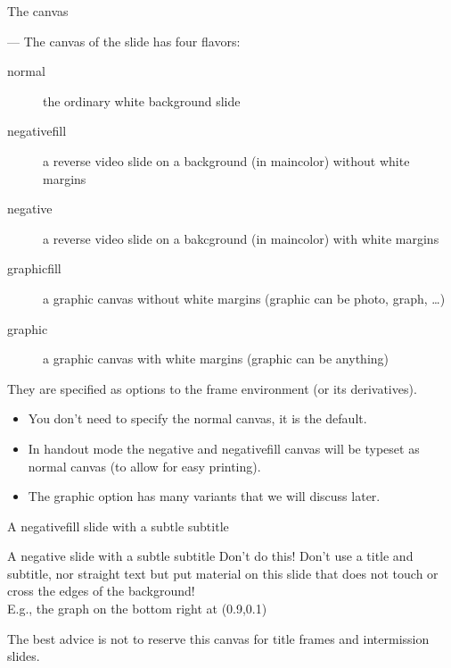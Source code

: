 \documentclass[aspectratio=1610]{beamer}
\begin{document}
\begin{frame}[t]
  {The canvas}

   --- The canvas of the slide has four flavors:
  \begin{description}
  \item[normal]
    the ordinary white background slide
  \item[negativefill]
    a reverse video slide on a background (in maincolor) without white
    margins
  \item[negative]
    a reverse video slide on a bakcground (in maincolor) with white
    margins
  \item[graphicfill]
    a graphic canvas without white margins (graphic can be photo,
    graph, \ldots)
  \item[graphic] a graphic canvas with white margins (graphic can be
    anything)
  \end{description}
  They are specified as options to the frame environment (or its
  derivatives).

  \begin{itemize}
  \item You don't need to specify the normal canvas, it is the
    default.
  \item In handout mode the negative and negativefill canvas will be
    typeset as normal canvas (to allow for easy printing).
  \item The graphic option has many variants that we will discuss later.
  \end{itemize}
\end{frame}

\begin{frame}[negativefill]
  {A negativefill slide}
  {with a subtle subtitle}
  \kant[1]
\end{frame}

\begin{frame}[negative,t]
  {A negative slide}
  {with a subtle subtitle}
  Don't do this! Don't use a title and subtitle, nor straight text
  but put material on this slide that does not touch or cross the
  edges of the background!\\
  E.g., the graph on the bottom right
  \place[anchor=south east] at (0.9,0.1) {
  }
  The best advice is not to reserve this canvas for title frames and
  intermission slides.
\end{frame}
\end{document}
